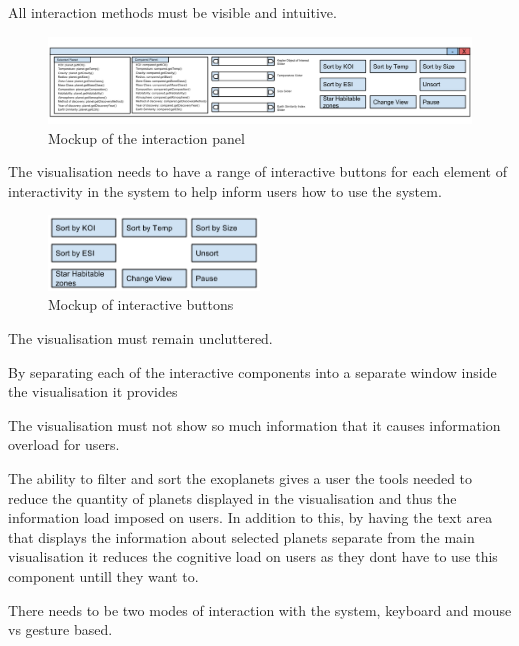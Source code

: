 \begin{enumerate}


{\bf \item[R6.] All interaction methods must be visible and intuitive.}
\begin{figure}[h!]
  \centering
      \includegraphics[width=1\textwidth]{images/allTogether.png}
  \caption{Mockup of the interaction panel}  
\end{figure}

 The visualisation needs to have a range of interactive buttons for
each element of interactivity in the system to help inform users how to use the
system.

\begin{figure}[h!]
  \centering
      \includegraphics[width=0.5\textwidth]{images/mockButtons.png}
  \caption{Mockup of interactive buttons}  
\end{figure}

{\bf \item[R7.] The visualisation must remain uncluttered.}

By separating each of the interactive components into a separate window inside
the visualisation it provides 

The visualisation must not show so much information that it
causes information overload for users.

The ability to filter and sort the exoplanets gives a user the tools needed to
reduce the quantity of planets displayed in the visualisation and thus the
information load imposed on users. 
In addition to this, by having the text area that displays the information about
selected planets separate from the main visualisation it reduces the cognitive
load on users as they dont have to use this component untill they want to. ~


{\bf  \item[R8.] There needs to be two modes of interaction with the system,
keyboard and mouse vs gesture based.}


\end{enumerate}
